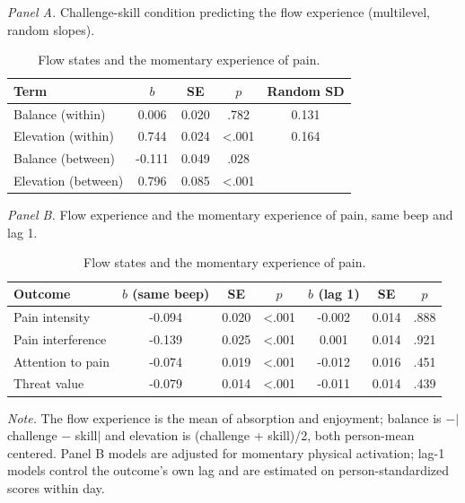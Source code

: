 \begin{table}[!htbp]
\raggedright
\caption{Flow states and the momentary experience of pain.}
\label{tab:flow}
\footnotesize
\begingroup
\setlength{\tabcolsep}{4pt}
\renewcommand{\arraystretch}{1.08}
\noindent\textit{Panel A.} Challenge-skill condition predicting the flow experience (multilevel, random slopes).\par\vspace{2pt}
\begin{tabular*}{\textwidth}{@{\extracolsep{\fill}}lcccc@{}}
\toprule
Term & $b$ & SE & $p$ & Random SD \\
\midrule
Balance (within) & 0.006 & 0.020 & .782 & 0.131 \\
Elevation (within) & 0.744 & 0.024 & <.001 & 0.164 \\
Balance (between) & -0.111 & 0.049 & .028 &  \\
Elevation (between) & 0.796 & 0.085 & <.001 &  \\
\bottomrule
\end{tabular*}
\par\vspace{6pt}\noindent\textit{Panel B.} Flow experience and the momentary experience of pain, same beep and lag 1.\par\vspace{2pt}
\begin{tabular*}{\textwidth}{@{\extracolsep{\fill}}lcccccc@{}}
\toprule
Outcome & $b$ (same beep) & SE & $p$ & $b$ (lag 1) & SE  & $p$  \\
\midrule
Pain intensity & -0.094 & 0.020 & <.001 & -0.002 & 0.014 & .888 \\
Pain interference & -0.139 & 0.025 & <.001 & 0.001 & 0.014 & .921 \\
Attention to pain & -0.074 & 0.019 & <.001 & -0.012 & 0.016 & .451 \\
Threat value & -0.079 & 0.014 & <.001 & -0.011 & 0.014 & .439 \\
\bottomrule
\end{tabular*}
\par\vspace{3pt}\noindent\parbox{\textwidth}{\footnotesize\textit{Note.} The flow experience is the mean of absorption and enjoyment; balance is $-|$challenge $-$ skill$|$ and elevation is (challenge + skill)/2, both person-mean centered. Panel B models are adjusted for momentary physical activation; lag-1 models control the outcome's own lag and are estimated on person-standardized scores within day.}
\endgroup
\end{table}
